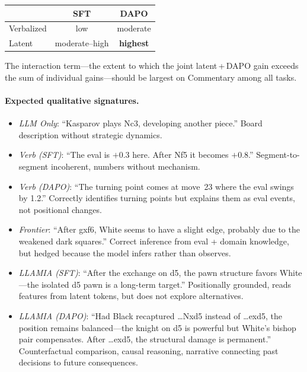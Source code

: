 \begin{center}
\small
\begin{tabular}{lcc}
\toprule
& \textbf{SFT} & \textbf{DAPO} \\
\midrule
Verbalized & low & moderate \\
Latent     & moderate--high & \textbf{highest} \\
\bottomrule
\end{tabular}
\end{center}

\noindent The interaction term---the extent to which the joint
latent\,+\,DAPO gain exceeds the sum of individual gains---should be
largest on Commentary among all tasks.

\paragraph{Expected qualitative signatures.}
\begin{itemize}[leftmargin=*, itemsep=1pt]
\item \emph{LLM Only}: ``Kasparov plays Nc3, developing another piece.''
  Board description without strategic dynamics.
\item \emph{Verb (SFT)}: ``The eval is $+0.3$ here.
  After Nf5 it becomes $+0.8$.''
  Segment-to-segment incoherent, numbers without mechanism.
\item \emph{Verb (DAPO)}: ``The turning point comes at move~23 where the
  eval swings by 1.2.''
  Correctly identifies turning points but explains them as eval events, not
  positional changes.
\item \emph{Frontier}: ``After gxf6, White seems to have a slight edge,
  probably due to the weakened dark squares.''
  Correct inference from eval + domain knowledge, but hedged because the
  model infers rather than observes.
\item \emph{LLAMIA (SFT)}: ``After the exchange on d5, the pawn structure
  favors White---the isolated d5 pawn is a long-term target.''
  Positionally grounded, reads features from latent tokens, but does not
  explore alternatives.
\item \emph{LLAMIA (DAPO)}: ``Had Black recaptured \ldots{}Nxd5 instead of
  \ldots{}exd5, the position remains balanced---the knight on d5 is
  powerful but White's bishop pair compensates.
  After \ldots{}exd5, the structural damage is permanent.''
  Counterfactual comparison, causal reasoning, narrative connecting past
  decisions to future consequences.
\end{itemize}

